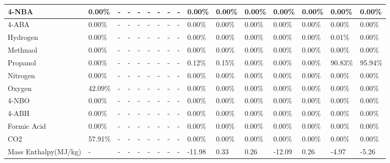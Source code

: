 \begin{landscape}
\begin{table}[H]
\begin{tabular}{|l|l|l|l|l|l|l|l|l|l|l|l|l|l|l|l|}
4-NBA                   & 0.00\%  & -    & -    & -    & -    & -    & -    & -    & 0.00\%  & 0.00\%  & 0.00\%  & 0.00\%  & 0.00\%  & 0.00\%  & 0.00\%  \\ \hline
4-ABA                   & 0.00\%  & -    & -    & -    & -    & -    & -    & -    & 0.00\%  & 0.00\%  & 0.00\%  & 0.00\%  & 0.00\%  & 0.00\%  & 0.00\%  \\ \hline
Hydrogen                & 0.00\%  & -    & -    & -    & -    & -    & -    & -    & 0.00\%  & 0.00\%  & 0.00\%  & 0.00\%  & 0.00\%  & 0.01\%  & 0.00\%  \\ \hline
Methnaol                & 0.00\%  & -    & -    & -    & -    & -    & -    & -    & 0.00\%  & 0.00\%  & 0.00\%  & 0.00\%  & 0.00\%  & 0.00\%  & 0.00\%  \\ \hline
Propanol                & 0.00\%  & -    & -    & -    & -    & -    & -    & -    & 0.12\%  & 0.15\%  & 0.00\%  & 0.00\%  & 0.00\%  & 90.83\% & 95.94\% \\ \hline
Nitrogen                & 0.00\%  & -    & -    & -    & -    & -    & -    & -    & 0.00\%  & 0.00\%  & 0.00\%  & 0.00\%  & 0.00\%  & 0.00\%  & 0.00\%  \\ \hline
Oxygen                  & 42.09\% & -    & -    & -    & -    & -    & -    & -    & 0.00\%  & 0.00\%  & 0.00\%  & 0.00\%  & 0.00\%  & 0.00\%  & 0.00\%  \\ \hline
4-NBO                   & 0.00\%  & -    & -    & -    & -    & -    & -    & -    & 0.00\%  & 0.00\%  & 0.00\%  & 0.00\%  & 0.00\%  & 0.00\%  & 0.00\%  \\ \hline
4-ABH                   & 0.00\%  & -    & -    & -    & -    & -    & -    & -    & 0.00\%  & 0.00\%  & 0.00\%  & 0.00\%  & 0.00\%  & 0.00\%  & 0.00\%  \\ \hline
Formic Acid             & 0.00\%  & -    & -    & -    & -    & -    & -    & -    & 0.00\%  & 0.00\%  & 0.00\%  & 0.00\%  & 0.00\%  & 0.00\%  & 0.00\%  \\ \hline
CO2                     & 57.91\% & -    & -    & -    & -    & -    & -    & -    & 0.00\%  & 0.00\%  & 0.00\%  & 0.00\%  & 0.00\%  & 0.00\%  & 0.00\%  \\ \hline
Mass Enthalpy(MJ/kg)    & -       & -    & -    & -    & -    & -    & -    & -    & -11.98  & 0.33    & 0.26    & -12.09  & 0.26    & -4.97   & -5.26   \\ \hline
\end{tabular}
\end{table}






\end{landscape}
